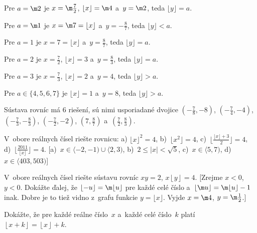 {{Pre $a=\m2$ je $x=\m\frac72$, $\lfloor x\rfloor=\m4$ a~$y=\m2$, teda $\lfloor y\rfloor=a$.

Pre $a=\m1$ je $x=\m7=\lfloor x\rfloor$ a~$y=-\frac87$, teda $\lfloor y\rfloor<a$.

Pre $a=1$ je $x=7=\lfloor x\rfloor$ a~$y=\frac87$, teda $\lfloor y\rfloor=a$.

Pre $a=2$ je $x=\frac72$, $\lfloor x\rfloor=3$ a~$y=\frac83$, teda $\lfloor y\rfloor=a$.

Pre $a=3$ je $x=\frac73$, $\lfloor x\rfloor=2$ a~$y=4$, teda $\lfloor y\rfloor>a$.

Pre $a\in\{4,5,6,7\}$ je $\lfloor x\rfloor=1$ a~$y=8$, teda $\lfloor y\rfloor>a$.
}

\zaver
Sústava rovníc má 6 riešení, sú nimi usporiadané dvojice
$\left(-\frac78,-8\right)$,
$\left(-\frac74,-4\right)$,
$\left(-\frac73,-\frac83\right)$,
$\left(-\frac72,-2\right)$,
$\left(7,\frac87\right)$
a~$\left(\frac72,\frac83\right)$.

V~obore reálnych čísel riešte rovnicu: a) ${\lfloor x \rfloor}^2=4$,
b)~$\lfloor x^2 \rfloor=4$, c)~$\bigl\lfloor{\frac {\lfloor x\rfloor
+3}{2}\bigr\rfloor}=4$, d)~$\bigl\lfloor{\frac {2011}{\lfloor
x\rfloor}\bigr\rfloor}=4$. [a)~$x\in\langle-2,-1)\cup\langle2,3)$,
b)~$2\leq |x|<\sqrt{5}$, c)~$x\in\langle5,7)$, d)~$x\in\langle403,503)$]

V~obore reálnych čísel riešte sústavu rovníc $xy=2$, $x\left\lfloor y
\right\rfloor =4$. [Zrejme $x<0$, $y<0$. Dokážte ďalej, že
$\lfloor-u\rfloor=\m\lfloor u\rfloor$ pre každé celé
číslo a~$\lfloor\m u\rfloor=\m\lfloor u\rfloor-1$ inak.
Dobre je to tiež vidno z~grafu funkcie $y=\lfloor x \rfloor$.
Vyjde $x=\m4$, $y=\m\frac{1}{2}$.]

Dokážte, že pre každé reálne číslo~$x$ a~každé celé číslo~$k$ platí
$\left\lfloor x+k \right\rfloor =\left\lfloor x \right\rfloor +k$.
}

